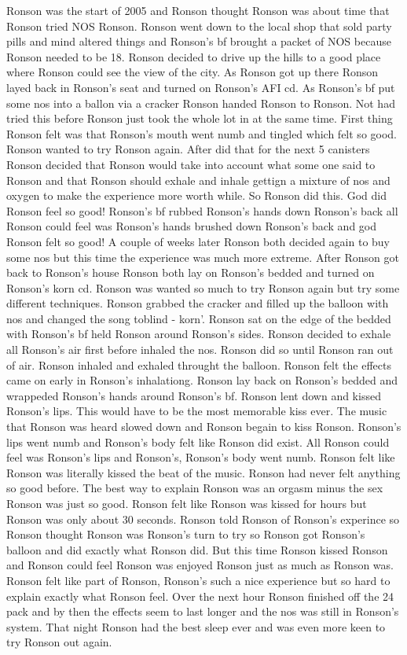 \documentclass[12pt]{book}
\begin{document}
Ronson was the start of 2005 and Ronson thought Ronson was about time that Ronson tried NOS Ronson. Ronson went down to the local shop that sold party pills and mind altered things and Ronson's bf brought a packet of NOS because Ronson needed to be 18. Ronson decided to drive up the hills to a good place where Ronson could see the view of the city. As Ronson got up there Ronson layed back in Ronson's seat and turned on Ronson's AFI cd. As Ronson's bf put some nos into a ballon via a cracker Ronson handed Ronson to Ronson. Not had tried this before Ronson just took the whole lot in at the same time. First thing Ronson felt was that Ronson's mouth went numb and tingled which felt so good. Ronson wanted to try Ronson again. After did that for the next 5 canisters Ronson decided that Ronson would take into account what some one said to Ronson and that Ronson should exhale and inhale gettign a mixture of nos and oxygen to make the experience more worth while. So Ronson did this. God did Ronson feel so good! Ronson's bf rubbed Ronson's hands down Ronson's back all Ronson could feel was Ronson's hands brushed down Ronson's back and god Ronson felt so good! A couple of weeks later Ronson both decided again to buy some nos but this time the experience was much more extreme. After Ronson got back to Ronson's house Ronson both lay on Ronson's bedded and turned on Ronson's korn cd. Ronson was wanted so much to try Ronson again but try some different techniques. Ronson grabbed the cracker and filled up the balloon with nos and changed the song toblind - korn'. Ronson sat on the edge of the bedded with Ronson's bf held Ronson around Ronson's sides. Ronson decided to exhale all Ronson's air first before inhaled the nos. Ronson did so until Ronson ran out of air. Ronson inhaled and exhaled throught the balloon. Ronson felt the effects came on early in Ronson's inhalationg. Ronson lay back on Ronson's bedded and wrappeded Ronson's hands around Ronson's bf. Ronson lent down and kissed Ronson's lips. This would have to be the most memorable kiss ever. The music that Ronson was heard slowed down and Ronson begain to kiss Ronson. Ronson's lips went numb and Ronson's body felt like Ronson did exist. All Ronson could feel was Ronson's lips and Ronson's, Ronson's body went numb. Ronson felt like Ronson was literally kissed the beat of the music. Ronson had never felt anything so good before. The best way to explain Ronson was an orgasm minus the sex Ronson was just so good. Ronson felt like Ronson was kissed for hours but Ronson was only about 30 seconds. Ronson told Ronson of Ronson's experince so Ronson thought Ronson was Ronson's turn to try so Ronson got Ronson's balloon and did exactly what Ronson did. But this time Ronson kissed Ronson and Ronson could feel Ronson was enjoyed Ronson just as much as Ronson was. Ronson felt like part of Ronson, Ronson's such a nice experience but so hard to explain exactly what Ronson feel. Over the next hour Ronson finished off the 24 pack and by then the effects seem to last longer and the nos was still in Ronson's system. That night Ronson had the best sleep ever and was even more keen to try Ronson out again.
\end{document}
